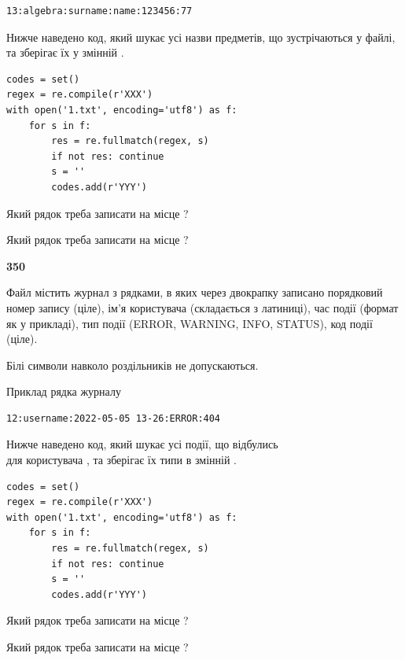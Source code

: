 \begin{verbatim}
13:algebra:surname:name:123456:77
\end{verbatim}


Нижче наведено код, який шукає усі назви предметів, що зустрічаються у файлі, та зберігає їх у змінній .



\begin{verbatim}
codes = set()
regex = re.compile(r'XXX')
with open('1.txt', encoding='utf8') as f:
    for s in f:
        res = re.fullmatch(regex, s)
        if not res: continue
        s = ''
        codes.add(r'YYY')
\end{verbatim}





Який рядок треба записати на місце  ?\par
\vspace{5mm}


Який рядок треба записати на місце  ?\par


\newpage

{\begin {center}\textbf{ 350}\end {center}}\par
Файл  містить журнал з рядками, в яких через двокрапку записано поряд\-ко\-вий номер запису (ціле), ім'я користувача (складається з латиниці), час події (фор\-мат як у прикладі), тип події (ERROR, WARNING, INFO, STATUS), код події (ціле).

Білі символи навколо роздільників не допускаються.

Приклад рядка журналу



\begin{verbatim}
12:username:2022-05-05 13-26:ERROR:404
\end{verbatim}


Нижче наведено код, який шукає усі події, що відбулись\\ для користувача , та зберігає їх типи в змінній .



\begin{verbatim}
codes = set()
regex = re.compile(r'XXX')
with open('1.txt', encoding='utf8') as f:
    for s in f:
        res = re.fullmatch(regex, s)
        if not res: continue
        s = ''
        codes.add(r'YYY')
\end{verbatim}





Який рядок треба записати на місце  ?\par
\vspace{5mm}


Який рядок треба записати на місце  ?\par


\newpage

